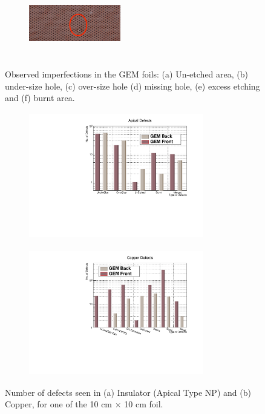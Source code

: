 \begin{figure}[!htbp]
\begin{subfigure}[b]{0.29\textwidth}
        \caption{ }
        \label{fig:O_5b}
    \end{subfigure}
    \centering
    \begin{subfigure}[b]{0.29\textwidth}
        \includegraphics[width=4cm, height=3cm]{figures/GEM/figures/3f.jpg}
        \caption{ }
        \label{fig:O_5c}
    \end{subfigure}
   \caption{Observed imperfections in the GEM foils: (a) Un-etched area, (b) under-size hole, (c) over-size hole (d) missing hole, (e) excess etching and (f) burnt area.} \label{fig:Optical_01}
\end{figure}
\begin{figure}[!htbp]
    \centering
    \begin{subfigure}[b]{0.49\textwidth}
        \includegraphics[width=7.6cm, height=5.5cm]{figures/GEM/figures/Apical_Defects.pdf}\qquad
        \caption{ }
        \label{fig:O_9a}
    \end{subfigure}
    \begin{subfigure}[b]{0.49\textwidth}
        \includegraphics[width=7.6cm, height=5.5cm]{figures/GEM/figures/CopperDefects.pdf}
        \caption{ }
        \label{fig:O_9b}
    \end{subfigure}
   \caption{Number of defects seen in (a) Insulator (Apical Type NP) and (b) Copper, for one of the 10 cm $\times$ 10 cm foil.} \label{fig:Optical_04}
\end{figure}

